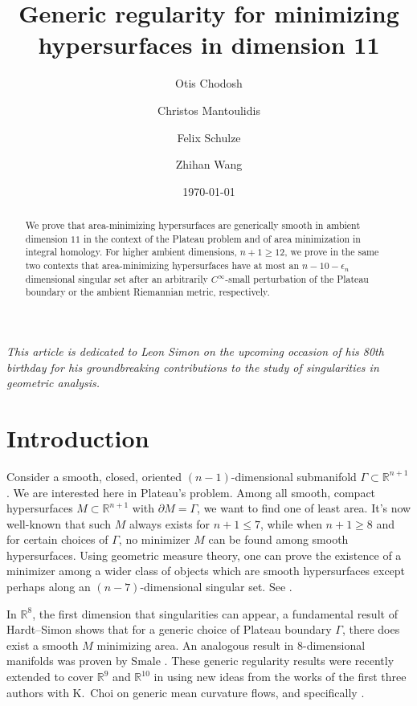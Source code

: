 \documentclass[11pt, letterpaper, reqno]{amsart}
\title{Generic regularity for minimizing hypersurfaces in dimension 11}
\author{Otis Chodosh}
\author{Christos Mantoulidis}
\author{Felix Schulze}
\author{Zhihan Wang}
\date{\today}
\numberwithin{equation}{section}
\theoremstyle{remark}
\newcommand{\RR}{\mathbb{R}}
\begin{document}
\begin{abstract}
We prove that area-minimizing hypersurfaces are generically smooth in ambient dimension $11$ in the context of the Plateau problem and of area minimization in integral homology. For higher ambient dimensions, $n+1 \geq 12$, we prove in the same two contexts that area-minimizing hypersurfaces have at most an $n-10-\epsilon_n$ dimensional singular set after an arbitrarily $C^\infty$-small perturbation of the Plateau boundary or the ambient Riemannian metric, respectively.
\end{abstract}

\maketitle

\textit{This article is dedicated to Leon Simon on the upcoming occasion of his 80th birthday for his groundbreaking contributions to the study of singularities in geometric analysis.}


\setcounter{tocdepth}{1}
\tableofcontents


\section{Introduction}

Consider a smooth, closed, oriented $(n-1)$-dimensional submanifold $\Gamma\subset \RR^{n+1}$. We are interested here in Plateau's problem. Among all smooth, compact hypersurfaces $M\subset \RR^{n+1}$ with $\partial M = \Gamma$, we want to find one of least area. It's now well-known that such $M$ always exists for $n+1\leq 7$, while when $n+1\geq 8$ and for certain choices of $\Gamma$, no minimizer $M$ can be found among smooth hypersurfaces. Using geometric measure theory, one can prove the existence of a minimizer among a wider class of objects which are smooth hypersurfaces except perhaps along an $(n-7)$-dimensional singular set. See \cite{Federer:GMT, MassariMiranda,Giusti,Maggi:finite-per,Fleming:plateau, DeGiorgi:bernstein, Almgren:regularity, Simons:minvar, BDG:Simons,Hardt-Simon:boundary-regularity}. 

In $\RR^8$, the first dimension that singularities can appear, a fundamental result of Hardt--Simon \cite{HardtSimon:isolated} shows that for a {generic} choice of Plateau boundary $\Gamma$, there does exist a smooth $M$ minimizing area. An analogous result in $8$-dimensional manifolds was proven by Smale \cite{Smale:generic}. These generic regularity results were recently extended to cover $\RR^9$ and $\RR^{10}$ in \cite{CMS:generic.9.10} using new ideas from the works of the first three authors with K.\ Choi on generic mean curvature flows, and specifically \cite{CCMS:gen.1, CCMS:gen.low.ent.1}. 
\end{document}
